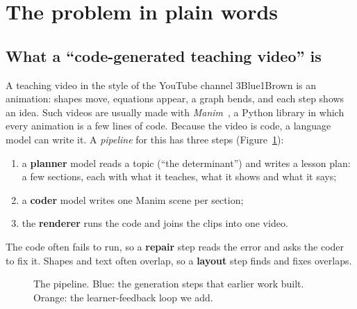 \documentclass[11pt]{article}
\begin{document}
\section{The problem in plain words}

\subsection{What a ``code-generated teaching video'' is}

A teaching video in the style of the YouTube channel 3Blue1Brown is an animation: shapes move, equations appear,
a graph bends, and each step shows an idea. Such videos are usually made with \emph{Manim}~\cite{manim}, a Python
library in which every animation is a few lines of code. Because the video is code, a language model can write it.
A \emph{pipeline} for this has three steps (Figure~\ref{fig:pipeline}):
\begin{enumerate}
  \item a \textbf{planner} model reads a topic (``the determinant'') and writes a lesson plan: a few sections, each
  with what it teaches, what it shows and what it says;
  \item a \textbf{coder} model writes one Manim scene per section;
  \item the \textbf{renderer} runs the code and joins the clips into one video.
\end{enumerate}
The code often fails to run, so a \textbf{repair} step reads the error and asks the coder to fix it. Shapes and text
often overlap, so a \textbf{layout} step finds and fixes overlaps.

\begin{figure}[h]
\centering
{}
\caption{The pipeline. Blue: the generation steps that earlier work built. Orange: the learner-feedback loop we
add.}\label{fig:pipeline}
\end{figure}
\end{document}
